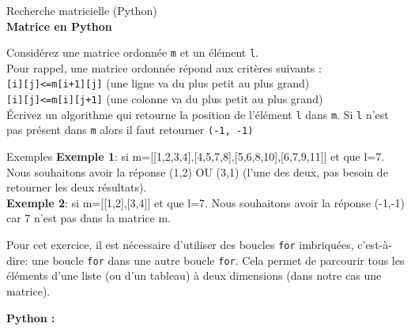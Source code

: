 \begin{Exercice}[20 minutes] Recherche matricielle (Python) \optionnel\\
    
    \textbf{Matrice en Python}

    Considérez une matrice ordonnée \lstinline{m} et un élément \lstinline{l}.\\
    
    Pour rappel, une matrice ordonnée répond aux critères suivants :\\
     \lstinline{[i][j]<=m[i+1][j]} (une ligne va du plus petit au plus grand)\\
     \lstinline{[i][j]<=m[i][j+1]} (une colonne va du plus petit au plus grand)\\
 
    
    Écrivez un algorithme qui retourne la position de l’élément \lstinline{l} dans \lstinline{m}. Si \lstinline{l} n’est pas présent dans \lstinline{m} alors il faut retourner \lstinline{(-1, -1)}\\
    
    \begin{Example}{\faTerminal \quad Exemples}
        \textbf{Exemple 1}: si m=[[1,2,3,4],[4,5,7,8],[5,6,8,10],[6,7,9,11]] et que l=7. Nous souhaitons avoir la réponse (1,2) OU (3,1) (l’une des deux, pas besoin de retourner les deux résultats).\\

        \textbf{Exemple 2}: si m=[[1,2],[3,4]] et que l=7. Nous souhaitons avoir la réponse (-1,-1) car 7 n’est pas dans la matrice m.
    \end{Example}

    

    \begin{conseil}
    Pour cet exercice, il est nécessaire d'utiliser des boucles \lstinline{for} imbriquées, c'est-à-dire: une boucle \lstinline{for} dans une autre boucle \lstinline{for}. Cela permet de parcourir tous les éléments d'une liste (ou d'un tableau) à deux dimensions (dans notre cas une matrice). 
    \end{conseil}

    \begin{solution}
        \textbf{Python :}
        
    \end{solution}

\end{Exercice}

\newpage

